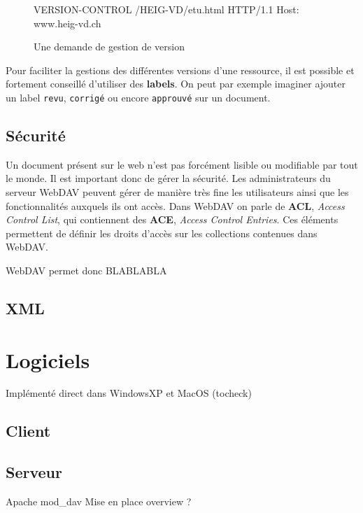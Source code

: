 \documentclass[a4paper, 11pt]{article}
\begin{document}
{		\begin{figure}[ht]
		\begin{center}
		\begin{boxedverbatim}
			VERSION-CONTROL /HEIG-VD/etu.html HTTP/1.1
			Host: www.heig-vd.ch
		\end{boxedverbatim}
		\caption{Une demande de gestion de version}
		\label{fig:req_version}
		\end{center}
		\end{figure}
		
		Pour faciliter la gestions des différentes versions d'une ressource, il est possible et fortement conseillé d'utiliser des \textbf{labels}. On peut par exemple imaginer ajouter un label \texttt{revu}, \texttt{corrigé} ou encore \texttt{approuvé} sur un document.
		
	
	\subsection{Sécurité}
	
		Un document présent sur le web n'est pas forcément lisible ou modifiable par tout le monde. Il est important donc de gérer la sécurité. Les administrateurs du serveur WebDAV peuvent gérer de manière très fine les utilisateurs ainsi que les fonctionnalités auxquels ils ont accès. Dans WebDAV on parle de \textbf{ACL}, \emph{Access Control List}, qui contiennent des \textbf{ACE}, \emph{Access Control Entries}. Ces éléments permettent de définir les droits d'accès sur les collections contenues dans WebDAV.
		
		WebDAV permet donc BLABLABLA
	
	\subsection{XML}

\section{Logiciels}
	Implémenté direct dans WindowsXP et MacOS (tocheck)
	\subsection{Client}
	\subsection{Serveur}
		Apache mod\_dav
		Mise en place overview ?
		
}
\end{document}
